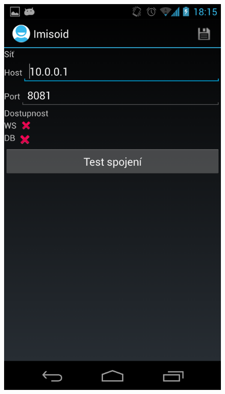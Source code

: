 \documentclass{bakalarka}
\begin{document}
\begin{figure}[H]
  \centering
  \includegraphics[scale=0.3]{scr/network.png}
  \label{}
\end{figure}
\end{document}
